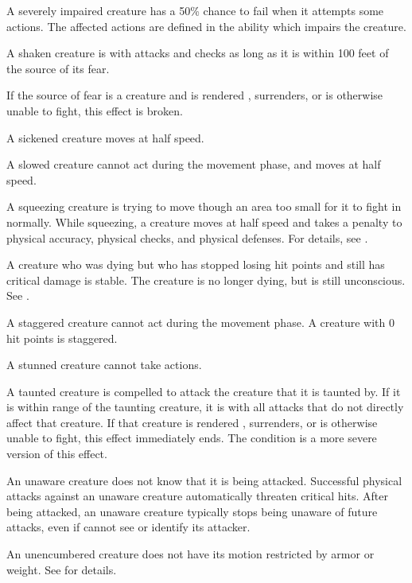  A severely impaired creature has a 50\% chance to fail when it attempts some actions. The affected actions are defined in the ability which impairs the creature.

 A shaken creature is \impaired with attacks and checks as long as it is within 100 feet of the source of its fear.

If the source of fear is a creature and is rendered \helpless, surrenders, or is otherwise unable to fight, this effect is broken.

 A sickened creature moves at half speed.

 A slowed creature cannot act during the movement phase, and moves at half speed.

 A squeezing creature is trying to move though an area too small for it to fight in normally.
While squeezing, a creature moves at half speed and takes a  penalty to physical accuracy, physical checks, and physical defenses.
For details, see .

 A creature who was dying but who has stopped losing hit points and still has critical damage is stable. The creature is no longer dying, but is still unconscious. See .

 A staggered creature cannot act during the movement phase. A creature with 0 hit points is staggered.

 A stunned creature cannot take actions.

 A taunted creature is compelled to attack the creature that it is taunted by.
If it is within \rngmed range of the taunting creature, it is \severelyimpaired with all attacks that do not directly affect that creature.
If that creature is rendered \helpless, surrenders, or is otherwise unable to fight, this effect immediately ends.
The  condition is a more severe version of this effect.

 An unaware creature does not know that it is being attacked. Successful physical attacks against an unaware creature automatically threaten critical hits. After being attacked, an unaware creature typically stops being unaware of future attacks, even if cannot see or identify its attacker.

 An unencumbered creature does not have its motion restricted by armor or weight. See  for details.
